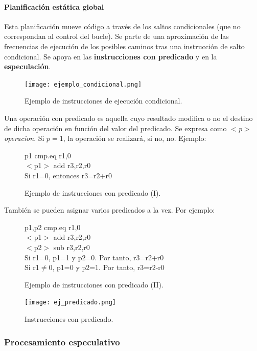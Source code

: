 \documentclass[12pt,spanish]{article}
\begin{document}
\paragraph{Planificación estática global\\}

Esta planificación mueve código a través de los saltos condicionales (que no correspondan al control del bucle). Se parte de una aproximación de las frecuencias de ejecución de los posibles caminos tras una instrucción de salto condicional. Se apoya en las \textbf{instrucciones con predicado} y en la \textbf{especulación}.


\begin{figure}[H]
\centering
\texttt{[image: ejemplo\_condicional.png]}
\caption{Ejemplo de instrucciones de ejecución condicional.}
\end{figure}



Una operación con predicado es aquella cuyo resultado modifica o no el destino de dicha operación en función del valor del predicado. Se expresa como \textit{$<$p$>$ operacion}. Si $p=1$, la operación se realizará, si no, no. Ejemplo:\\
\begin{figure}[H]
\centering
p1 cmp.eq r1,0\\
$<$p1$>$ add r3,r2,r0\\
Si r1=0, entonces r3=r2+r0
\caption{Ejemplo de instrucciones con predicado (I).}
\end{figure}

También se pueden asignar varios predicados a la vez. Por ejemplo:

\begin{figure}[H]
\centering
p1,p2 cmp.eq r1,0\\
$<$p1$>$ add r3,r2,r0\\
$<$p2$>$ sub r3,r2,r0\\
Si r1=0, p1=1 y p2=0. Por tanto, r3=r2+r0\\
Si r1$\neq$0, p1=0 y p2=1. Por tanto, r3=r2-r0\\
\caption{Ejemplo de instrucciones con predicado (II).}
\end{figure}

\begin{figure}[H]
\centering
\texttt{[image: ej\_predicado.png]}
\caption{Instrucciones con predicado.}
\end{figure}

\subsubsection{Procesamiento especulativo}
\end{document}
